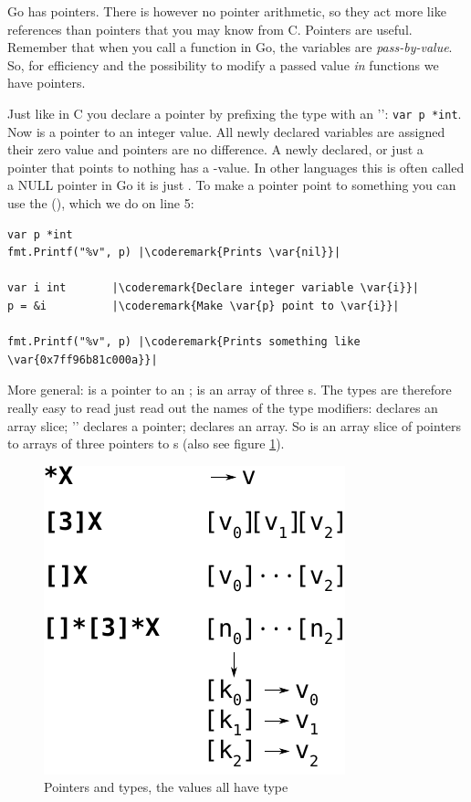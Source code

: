 \noindent{}
Go has pointers.
There is however no pointer arithmetic, so they act more like
references than pointers that you may know from C. Pointers 
are useful.
Remember that when you call a function in Go, the variables are
\emph{pass-by-value}. So, for efficiency and the possibility to modify a
passed value \emph{in} functions we have pointers.

Just like in C you declare a pointer by prefixing the type with an
'\key{*}':
\lstinline{var p *int}. Now  is a pointer to an integer value.
All newly declared variables are assigned their zero value and pointers
are no difference. A newly declared, or just a pointer that points to
nothing has a -value. In other languages this is often called
a NULL pointer in Go it is just . To make 
a pointer point to something you can use the 
(\func{\&}), which we do on line 5:
\begin{lstlisting}[caption=Use of a pointer,label=src:pointers]
var p *int
fmt.Printf("%v", p) |\coderemark{Prints \var{nil}}|

var i int	    |\coderemark{Declare integer variable \var{i}}|
p = &i		    |\coderemark{Make \var{p} point to \var{i}}|

fmt.Printf("%v", p) |\coderemark{Prints something like \var{0x7ff96b81c000a}}|
\end{lstlisting}

More general:  is a pointer to an ;  is an
array of three s. The
types are therefore really easy to read just read out the names of the
type modifiers: \type{[]} declares an array slice;
'\key{*}'
declares a pointer; \type{[size]} declares an array. So
 is an array slice of pointers to arrays of three
pointers to s (also see figure \ref{fig:pointers}).
\begin{figure}[h]
\caption[Pointers and types]{Pointers and types, the values  all have type }
\label{fig:pointers}
\begin{center}
\includegraphics[scale=0.65]{fig/pointers.pdf}
\end{center}
\end{figure}

